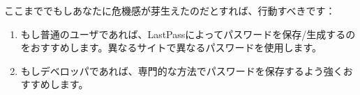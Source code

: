 ここまででもしあなたに危機感が芽生えたのだとすれば、行動すべきです：

\begin{enumerate}
  \item もし普通のユーザであれば、LastPassによってパスワードを保存/生成するのをおすすめします。異なるサイトで異なるパスワードを使用します。
  \item もしデベロッパであれば、専門的な方法でパスワードを保存するよう強くおすすめします。
\end{enumerate}
